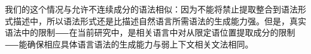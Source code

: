 我们的这个情况与允许不连续成分的语法相似：因为不能将禁止提取整合到语法形式描述中，所以语法形式还是比描述自然语言所需语法的生成能力强。但是，真实语法中的限制⸺在当前研究中，是相关语言中对从限定语位置提取成分的限制⸺能确保相应具体语言语法的生成能力与弱上下文相关文法相同。



